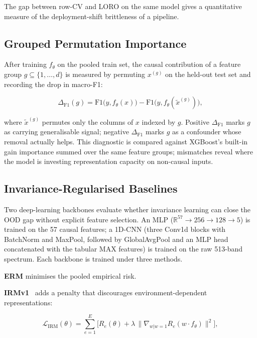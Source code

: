 \documentclass[sensors,article,submit,pdftex,oneauthor]{Definitions/mdpi}
\begin{document}
The gap between row-CV and LORO on the same model gives a
quantitative measure of the deployment-shift brittleness of
a pipeline.

\subsection{Grouped Permutation Importance}\label{sec:method-perm}

After training $f_\theta$ on the pooled train set, the
causal contribution of a feature group $g \subseteq
\{1,\dots,d\}$ is measured by permuting $x^{(g)}$ on the held-out
test set and recording the drop in macro-F1:

\begin{linenomath}
\begin{equation}
\Delta_{\mathrm{F1}}(g) = \mathrm{F1}\bigl(y, f_\theta(x)\bigr)
  - \mathrm{F1}\bigl(y, f_\theta(\tilde{x}^{(g)})\bigr),
\end{equation}
\end{linenomath}

where $\tilde{x}^{(g)}$ permutes only the columns of $x$
indexed by $g$. Positive $\Delta_\mathrm{F1}$ marks $g$ as
carrying generalisable signal; negative
$\Delta_\mathrm{F1}$ marks $g$ as a confounder whose removal
actually helps. This diagnostic is compared against XGBoost's
built-in gain importance summed over the same feature groups;
mismatches reveal where the model is investing representation
capacity on non-causal inputs.

\subsection{Invariance-Regularised Baselines}\label{sec:method-irm}

Two deep-learning backbones evaluate whether invariance
learning can close the OOD gap without explicit feature
selection. An MLP ($\mathbb{R}^{57}
\to 256 \to 128 \to 5$) is trained on the 57 causal features;
a 1D-CNN (three Conv1d blocks with BatchNorm and MaxPool,
followed by GlobalAvgPool and an MLP head concatenated with
the tabular MAX features) is trained on the raw 513-band
spectrum. Each backbone is trained under three methods.

\textbf{ERM} minimises the pooled empirical risk.

\textbf{IRMv1}~\cite{arjovsky2019irm} adds a penalty that
discourages environment-dependent representations:

\begin{linenomath}
\begin{equation}
\mathcal{L}_{\mathrm{IRM}}(\theta) =
  \sum_{e=1}^{E} \bigl[R_e(\theta)
  + \lambda \,\lVert \nabla_{w|w=1}
    R_e(w \cdot f_\theta) \rVert^2 \bigr],
\label{eq:irm}
\end{equation}
\end{linenomath}
\end{document}
